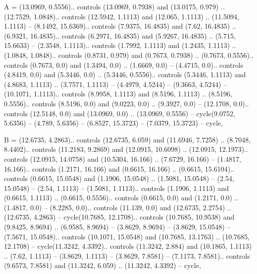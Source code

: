 A = {(13.0969, 0.5556).. controls (13.0969, 0.7938) and (13.0175, 0.979) .. (12.7529, 1.0848).. controls (12.5942, 1.1113) and (12.065, 1.1113) .. (11.5094, 1.1113) -- (8.1492, 15.6369).. controls (7.9375, 16.4835) and (7.62, 16.4835) .. (6.9321, 16.4835).. controls (6.2971, 16.4835) and (5.9267, 16.4835) .. (5.715, 15.6633) -- (2.3548, 1.1113).. controls (1.7992, 1.1113) and (1.2435, 1.1113) .. (1.0848, 1.0848).. controls (0.8731, 0.979) and (0.7673, 0.7938) .. (0.7673, 0.5556).. controls (0.7673, 0.0) and (1.3494, 0.0) .. (1.6669, 0.0) -- (4.4715, 0.0).. controls (4.8419, 0.0) and (5.3446, 0.0) .. (5.3446, 0.5556).. controls (5.3446, 1.1113) and (4.8683, 1.1113) .. (3.7571, 1.1113) -- (4.4979, 4.5244) -- (9.3663, 4.5244) -- (10.1071, 1.1113).. controls (8.9958, 1.1113) and (8.5196, 1.1113) .. (8.5196, 0.5556).. controls (8.5196, 0.0) and (9.0223, 0.0) .. (9.3927, 0.0) -- (12.1708, 0.0).. controls (12.5148, 0.0) and (13.0969, 0.0) .. (13.0969, 0.5556) -- cycle(9.0752, 5.6356) -- (4.789, 5.6356) -- (6.8527, 15.3723) -- (7.0379, 15.3723) -- cycle},

B = {(12.6735, 4.2863).. controls (12.6735, 6.059) and (11.6946, 7.7258) .. (8.7048, 8.4402).. controls (11.2183, 9.2869) and (12.0915, 10.6098) .. (12.0915, 12.1973).. controls (12.0915, 14.0758) and (10.5304, 16.166) .. (7.6729, 16.166) -- (1.4817, 16.166).. controls (1.2171, 16.166) and (0.6615, 16.166) .. (0.6615, 15.6104).. controls (0.6615, 15.0548) and (1.1906, 15.0548) .. (1.5081, 15.0548) -- (2.54, 15.0548) -- (2.54, 1.1113) -- (1.5081, 1.1113).. controls (1.1906, 1.1113) and (0.6615, 1.1113) .. (0.6615, 0.5556).. controls (0.6615, 0.0) and (1.2171, 0.0) .. (1.4817, 0.0) -- (8.2285, 0.0).. controls (11.139, 0.0) and (12.6735, 2.2754) .. (12.6735, 4.2863) -- cycle(10.7685, 12.1708).. controls (10.7685, 10.9538) and (9.8425, 8.9694) .. (6.9585, 8.9694) -- (3.8629, 8.9694) -- (3.8629, 15.0548) -- (7.5671, 15.0548).. controls (10.1071, 15.0548) and (10.7685, 13.1763) .. (10.7685, 12.1708) -- cycle(11.3242, 4.3392).. controls (11.3242, 2.884) and (10.1865, 1.1113) .. (7.62, 1.1113) -- (3.8629, 1.1113) -- (3.8629, 7.8581) -- (7.1173, 7.8581).. controls (9.6573, 7.8581) and (11.3242, 6.059) .. (11.3242, 4.3392) -- cycle},

